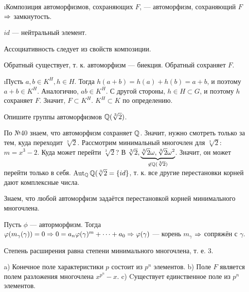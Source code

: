 \begin{solution}
\begin{enumerate}
\def\labelenumi{\alph{enumi})}
\i Композиция автоморфизмов, сохраняющих \(F\), --- автоморфизм, сохраняющий \(F\) \(\Rightarrow\) замкнутость.

\(id\) --- нейтральный элемент.

Ассоциативность следует из свойств композиции.

Обратный существует, т. к. автоморфизм --- биекция. Обратный сохраняет \(F\).

\i Пусть \(a, b \in K^H, h \in H\). Тогда \(h(a + b) = h(a) + h(b) = a + b\), и поэтому \(a + b \in K^H\). Аналогично, \(ab \in K^H\). С другой стороны, \(h \in H \subset G\), и поэтому \(h\) сохраняет \(F\). Значит, \(F \subset K^H\).
\(K^H \subset K\) по определению.
\end{enumerate}
\end{solution}

\begin{problem}[42 (10.5)]
Опишите группы автоморфизмов $\mathbb{Q}(\sqrt[3]{2})$.
\end{problem}

\begin{solution}
По №40 знаем, что автоморфизм сохраняет $\mathbb{Q}$. Значит, нужно смотреть только за тем, куда переходит $\sqrt[3]{2}$.
Рассмотрим минимальный многочлен для $\sqrt[3]{2}$: $m = x^3-2$.
Куда может перейти $\sqrt[3]{2}$? В $\sqrt[3]{2}, \underbrace{\sqrt[3]{2}\omega, \sqrt[3]{2}\omega^2}_{\not\in \mathbb{Q}(\sqrt[3]{2})}$. Значит, он может перейти только в себя. \(\operatorname{Aut}_{\mathbb{Q}} \mathbb{Q}(\sqrt[3]{2} = \{id\}\), т. к. все другие перестановки корней дают комплексные числа.

Знаем, что любой автоморфизм задаётся перестановкой корней минимального многочлена.

Пусть \(\phi\) --- авторморфизм. Тогда \(\varphi(m_\gamma(\gamma)) = 0 \Rightarrow 0 = a_n \varphi(\gamma)^m+\dots+a_0 \Rightarrow \varphi(\gamma)\) --- корень \(m_\gamma\) \(\Rightarrow\) сопряжён с \(\gamma\).

Степень расширения равна степени минимального многочлена, т. е. $3$.
\end{solution}

\begin{problem}
a) Конечное поле характеристики $p$ состоит из $p^n$ элементов. 
b) Поле $F$ является полем разложения многочлена $x^{p^n}-x$. 
c) Cуществует единственное поле из $p^n$ элементов.
\end{problem}

